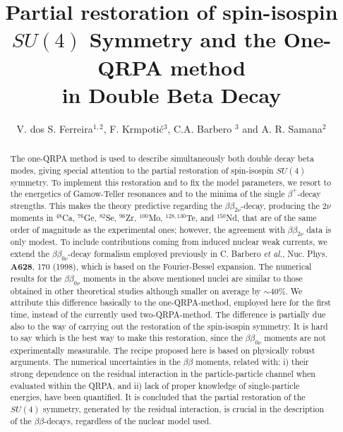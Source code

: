 \documentclass[nofootinbib,twocolumn,eqsecnum,floats,aps]{revtex4}
\def\etal {{\it et al.}}
\def\b {{\beta}}
\begin{document}

\title{ Partial restoration of  spin-isospin $SU(4)$ Symmetry
and the One-QRPA method\\
in Double Beta Decay}
\author{ V. dos S. Ferreira$^{1,2}$, F. Krmpoti\'c$^{3}$, C.A. Barbero $^{3}$
and  A. R. Samana$^{2}$}
%
%
%

\begin{abstract}
The one-QRPA method is used
to describe   simultaneously  both double decay beta modes, giving special attention  to the partial restoration of
spin-isospin $SU(4)$ symmetry. 
To implement this restoration and to fix the model parameters, we resort to the energetics of
Gamow-Teller resonances and to the minima of the single
$\beta^+$-decay strengths. This makes the theory   predictive
regarding the $\b\b_{2\nu}$-decay,   
producing the $2\nu$ moments  
in $^{48}$Ca, $^{76}$Ge, $^{82}$Se, $^{96}$Zr, $^{100}$Mo, $^{128,130}$Te, and $^{150}$Nd,
that are of the same order of magnitude as the experimental ones; however,
the agreement with $\b\b_{2\nu}$ data is only modest.
To include contributions coming  from induced nuclear weak
currents, we extend the  $\b\b_{0\nu}$-decay formalism employed
previously in C. Barbero \etal,  Nuc. Phys. \textbf{A628}, 170 (1998),
which is  based on the Fourier-Bessel expansion. The
numerical results for  the $\b\b_{0\nu}$ moments  in the above
mentioned nuclei are similar  to those obtained in other
theoretical studies although smaller on average
by $\sim 40\%$. We attribute this difference basically  to the one-QRPA-method,
employed here  for the first time, instead  of the currently used two-QRPA-method. The difference is
partially due also  to the way of carrying out the restoration of the spin-isospin
symmetry. It is hard to say which is the best way to  make this restoration,
since  the $\b\b_{0\nu}$ moments are not experimentally measurable.
The recipe  proposed here is based on physically robust arguments.
The numerical uncertainties  in the  $\b\b$ moments, related with:
i) their  strong dependence on the residual interaction in
the particle-particle channel when evaluated within the QRPA,
and ii) lack of proper knowledge of single-particle energies,
have been quantified.
It is concluded that the partial restoration of the $SU (4)$ symmetry, generated
by the residual interaction, is crucial in the description of the $\b\b$-decays,
regardless of the nuclear model used.
\end{abstract}
\end{document}
